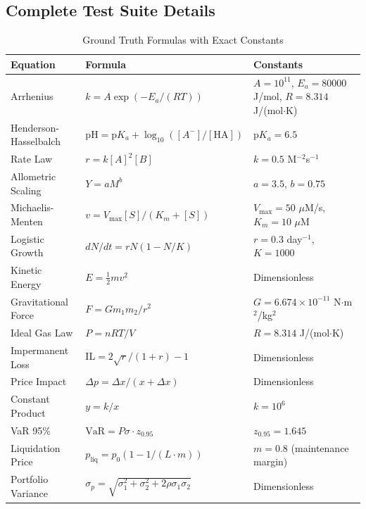 \documentclass[twoside,11pt]{article}
\begin{document}
\subsection{Complete Test Suite Details}

\begin{table}[H]
\centering
\caption{Ground Truth Formulas with Exact Constants}
\label{tab:formulas_detailed}
\scriptsize
\begin{tabular}{lll}
\toprule
\textbf{Equation} & \textbf{Formula} & \textbf{Constants} \\
\midrule
Arrhenius & $k = A\exp(-E_a/(RT))$ & $A=10^{11}$, $E_a=80000$ J/mol, $R=8.314$ J/(mol$\cdot$K) \\
Henderson-Hasselbalch & $\text{pH} = \text{p}K_a + \log_{10}([A^-]/[\text{HA}])$ & $\text{p}K_a = 6.5$ \\
Rate Law & $r = k[A]^2[B]$ & $k = 0.5$ M$^{-2}$s$^{-1}$ \\
Allometric Scaling & $Y = aM^b$ & $a = 3.5$, $b = 0.75$ \\
Michaelis-Menten & $v = V_{\max}[S]/(K_m + [S])$ & $V_{\max} = 50$ $\mu$M/s, $K_m = 10$ $\mu$M \\
Logistic Growth & $dN/dt = rN(1-N/K)$ & $r = 0.3$ day$^{-1}$, $K = 1000$ \\
Kinetic Energy & $E = \frac{1}{2}mv^2$ & Dimensionless \\
Gravitational Force & $F = Gm_1m_2/r^2$ & $G = 6.674 \times 10^{-11}$ N$\cdot$m$^2$/kg$^2$ \\
Ideal Gas Law & $P = nRT/V$ & $R = 8.314$ J/(mol$\cdot$K) \\
Impermanent Loss & $\text{IL} = 2\sqrt{r}/(1+r) - 1$ & Dimensionless \\
Price Impact & $\Delta p = \Delta x/(x + \Delta x)$ & Dimensionless \\
Constant Product & $y = k/x$ & $k = 10^6$ \\
VaR 95\% & $\text{VaR} = P\sigma \cdot z_{0.95}$ & $z_{0.95} = 1.645$ \\
Liquidation Price & $p_{\text{liq}} = p_0(1 - 1/(L \cdot m))$ & $m = 0.8$ (maintenance margin) \\
Portfolio Variance & $\sigma_p = \sqrt{\sigma_1^2 + \sigma_2^2 + 2\rho\sigma_1\sigma_2}$ & Dimensionless \\
\bottomrule
\end{tabular}
\end{table}

\end{document}
